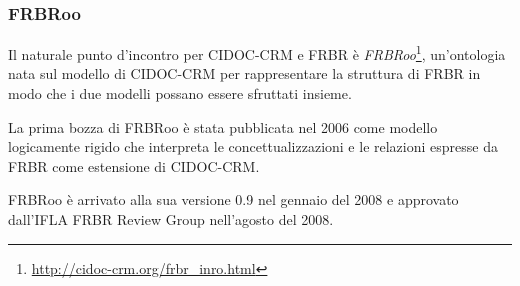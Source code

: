 \subsubsection{FRBRoo}

Il naturale punto d'incontro per CIDOC-CRM e FRBR è \emph{FRBRoo}\footnote{\url{http://cidoc-crm.org/frbr_inro.html}}, un'ontologia nata sul modello di CIDOC-CRM per rappresentare la struttura di FRBR in modo che i due modelli possano essere sfruttati insieme.

La prima bozza di FRBRoo è stata pubblicata nel 2006 come modello logicamente rigido che interpreta le concettualizzazioni e le relazioni espresse da FRBR come estensione di CIDOC-CRM.

FRBRoo è arrivato alla sua versione 0.9 nel gennaio del 2008 e approvato dall'IFLA FRBR Review Group nell'agosto del 2008.
